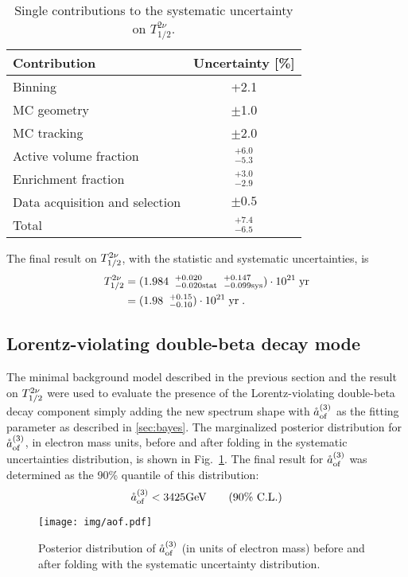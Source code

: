 \begin{table}
	\centering
	\caption{Single contributions to the systematic uncertainty on $T_{1/2}^{2\nu}.$}\label{tab:sys}
	{\renewcommand{\arraystretch}{1.1}
	\begin{tabular}{lc}
			\toprule
			Contribution					&	Uncertainty [\%]	\\
			\midrule
			Binning							&	+2.1				\\
			MC geometry						&	$\pm$1.0			\\
			MC tracking						&	$\pm$2.0			\\
			Active volume fraction 			&	$^{+6.0}_{-5.3}$	\\
			Enrichment fraction				&	$^{+3.0}_{-2.9}$	\\
			Data acquisition and selection	&	$\pm0.5$			\\
			\midrule
			Total							&	$^{+7.4}_{-6.5}$	\\
			\bottomrule
	\end{tabular}}
\end{table}
The final result on $T_{1/2}^{2\nu}$, with the statistic and systematic uncertainties, is
\begin{equation}
	\begin{split}
		T_{1/2}^{2\nu} &=({1.984\;\;^{+0.020}_{-0.020\text{stat}}}\;\;{^{+0.147}_{-0.099\text{sys}}})\cdot10^{21}\;\text{yr}\\
				   &=(1.98\;\;^{+0.15}_{-0.10})\cdot10^{21}\;\text{yr}\;.\\
	\end{split}
\end{equation}
\subsection*{Lorentz-violating double-beta decay mode}
The minimal background model described in the previous section and the result on $T_{1/2}^{2\nu}$ were used to evaluate the presence of the Lorentz-violating double-beta decay component simply adding the new spectrum shape with $\mathring{a}_\text{of}^{(3)}$ as the fitting parameter as described in \ref{sec:bayes}. The marginalized posterior distribution for $\mathring{a}_\text{of}^{(3)}$, in electron mass units, before and after folding in the systematic uncertainties distribution, is shown in Fig.~\ref{fig:aofpost}. The final result for $\mathring{a}_\text{of}^{(3)}$ was determined as the 90\% quantile of this distribution:
\begin{equation}\mathring{a}_\text{of}^{(3)}<3425 \text{GeV}\qquad(\text{90\% C.L.})\end{equation}
\begin{figure}
	\centering
	\texttt{[image: img/aof.pdf]}
	\caption{Posterior distribution of $\mathring{a}_\text{of}^{(3)}$ (in units of electron mass) before and after folding with the systematic uncertainty distribution.}\label{fig:aofpost}
\end{figure}

